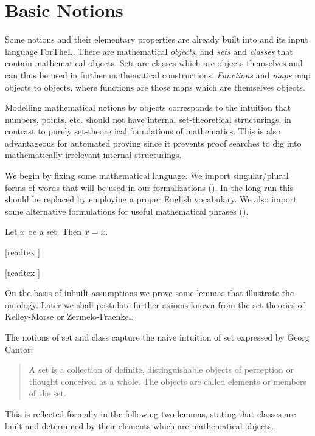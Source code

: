 \documentclass{article}
\begin{document}
\section{Basic Notions}

Some notions and their elementary properties are already
built into \Naproche{} and its input language 
ForTheL. There are
mathematical {\em objects}, and {\em sets} and 
{\em classes} that contain mathematical
objects. Sets are classes which are objects themselves and
can thus be used in further mathematical constructions. 
{\em Functions}
and {\em maps} map objects to objects, where 
functions are those
maps which are themselves objects.

Modelling mathematical notions by objects corresponds
to the intuition that numbers, points, etc. should
not have internal set-theoretical
structurings, in contrast to purely set-theoretical
foundations of mathematics. This is also advantageous
for automated proving since it prevents proof searches to
dig into mathematically irrelevant internal structurings.

We begin by fixing some mathematical language. 
We import singular/plural forms of words that will be used in
our formalizations ().
In the long run this should be replaced by
employing a proper English vocabulary. We also
import some alternative formulations for
useful mathematical phrases ().

\begin{forthel}
\begin{lemma} Let $x$ be a set. Then $x=x$. \end{lemma}
  [readtex ]

  [readtex ]
\end{forthel}


On the basis of inbuilt assumptions we prove some 
lemmas that illustrate the \Naproche{} ontology. 
Later we shall postulate further axioms known from the
set theories of Kelley-Morse or Zermelo-Fraenkel.

The notions of set and class capture the naive intuition
of set expressed by Georg Cantor:
%
\begin{quotation}
\noindent A set is a collection of definite, distinguishable objects 
of perception or thought conceived as a whole. 
The objects are called elements or members of the set.
\end{quotation}
%
This is reflected formally in the following two lemmas, stating
that classes are built and determined by their
elements which are mathematical objects.
\end{document}
